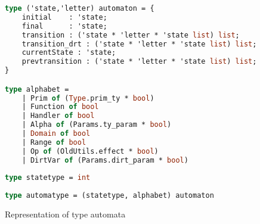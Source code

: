 \begin{figure}
\caption{Representation of type automata}
\label{lst:simple}
\begin{lstlisting}[language=Caml]
type ('state,'letter) automaton = {
    initial    : 'state;
    final      : 'state;
    transition : ('state * 'letter * 'state list) list;
    transition_drt : ('state * 'letter * 'state list) list;
    currentState : 'state;
    prevtransition : ('state * 'letter * 'state list) list;
}

type alphabet =
    | Prim of (Type.prim_ty * bool)
    | Function of bool
    | Handler of bool
    | Alpha of (Params.ty_param * bool)
    | Domain of bool
    | Range of bool
    | Op of (OldUtils.effect * bool)
    | DirtVar of (Params.dirt_param * bool)
    
type statetype = int
    
type automatype = (statetype, alphabet) automaton
\end{lstlisting}
\end{figure}
